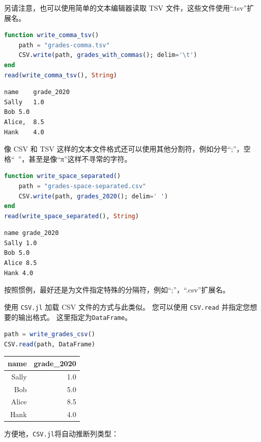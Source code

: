 \documentclass[
  notoc %
]{tufte-book}
\newcommand{\passthrough}[1]{#1}
\begin{document}
另请注意，也可以使用简单的文本编辑器读取 TSV
文件，这些文件使用``.tsv''扩展名。

\begin{lstlisting}[language=Julia]
function write_comma_tsv()
    path = "grades-comma.tsv"
    CSV.write(path, grades_with_commas(); delim='\t')
end
read(write_comma_tsv(), String)
\end{lstlisting}

\begin{lstlisting}[language=Output]
name    grade_2020
Sally   1.0
Bob 5.0
Alice,  8.5
Hank    4.0

\end{lstlisting}

像 CSV 和 TSV
这样的文本文件格式还可以使用其他分割符，例如分号``;''，空格``~''，甚至是像``π''这样不寻常的字符。

\begin{lstlisting}[language=Julia]
function write_space_separated()
    path = "grades-space-separated.csv"
    CSV.write(path, grades_2020(); delim=' ')
end
read(write_space_separated(), String)
\end{lstlisting}

\begin{lstlisting}[language=Output]
name grade_2020
Sally 1.0
Bob 5.0
Alice 8.5
Hank 4.0

\end{lstlisting}

按照惯例，最好还是为文件指定特殊的分隔符，例如``;''，``.csv''扩展名。

使用 \passthrough{\lstinline!CSV.jl!} 加载 CSV 文件的方式与此类似。
您可以使用 \passthrough{\lstinline!CSV.read!} 并指定您想要的输出格式。
这里指定为\passthrough{\lstinline!DataFrame!}。

\begin{lstlisting}[language=Julia]
path = write_grades_csv()
CSV.read(path, DataFrame)
\end{lstlisting}

\begin{longtable}[]{@{}rr@{}}
\toprule
name & grade\_2020 \\
\midrule
\endhead
Sally & 1.0 \\
Bob & 5.0 \\
Alice & 8.5 \\
Hank & 4.0 \\
\bottomrule
\end{longtable}

方便地，\passthrough{\lstinline!CSV.jl!}将自动推断列类型：
\end{document}
